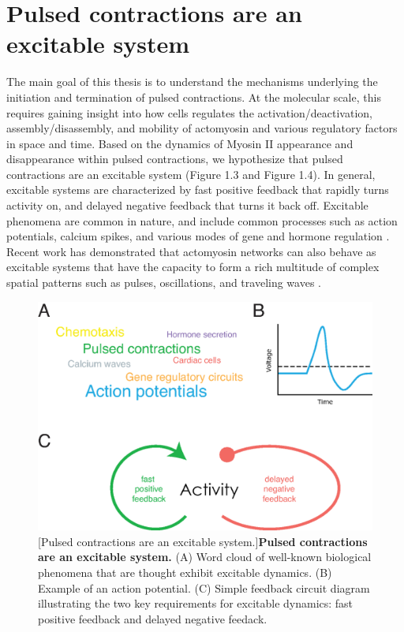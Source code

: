 \documentclass{ucetd}
\begin{document}
\section{Pulsed contractions are an excitable system}
The main goal of this thesis is to understand the mechanisms underlying the initiation and termination of pulsed contractions.  At the molecular scale, this requires gaining insight into how cells regulates the activation/deactivation, assembly/disassembly, and mobility of actomyosin and various regulatory factors in space and time.  Based on the dynamics of Myosin II appearance and disappearance within pulsed contractions, we hypothesize that pulsed contractions are an excitable system (Figure 1.3 and Figure 1.4).  In general, excitable systems are characterized by fast positive feedback that rapidly turns activity on, and delayed negative feedback that turns it back off.  Excitable phenomena are common in nature, and include common processes such as action potentials, calcium spikes, and various modes of gene and hormone regulation \cite{Izhikevich:2007aa, Goldbeter:1996aa, Strogatz:1994tz}.  Recent work has demonstrated that actomyosin networks can also behave as excitable systems that have the capacity to form a rich multitude of complex spatial patterns such as pulses, oscillations, and traveling waves \cite{Ryan:2012bq, Allard:2013if, Dierkes:2014tm}.

\begin{figure}[!htbp]
\centering
\includegraphics[width=1\textwidth]{Figure1-3}
[Pulsed contractions are an excitable system.]{\textbf{Pulsed contractions are an excitable system.} (A) Word cloud of well-known biological phenomena that are thought exhibit excitable dynamics. (B) Example of an action potential. (C) Simple feedback circuit diagram illustrating the two key requirements for excitable dynamics: fast positive feedback and delayed negative feedack.}
\end{figure}
\end{document}
